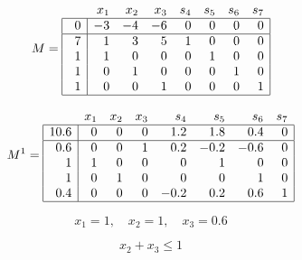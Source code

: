 {\newpage\clearpage
{}%
\begin{displaymath}
         M =
         \begin{array}{|r|rrrrrrr|}
            \multicolumn{1}{c}{\quad} & x_1 & x_2 & x_3 & s_4 & s_5 & s_6 &
                \multicolumn{1}{c}{s_7} \\\hline
             0 & -3 & -4 & -6 & 0 & 0 & 0 & 0 \\\hline
             7 & 1 & 3 & 5 & 1 & 0 & 0 & 0 \\
             1 & 1 & 0 & 0 & 0 & 1 & 0 & 0 \\
             1 & 0 & 1 & 0 & 0 & 0 & 1 & 0 \\
             1 & 0 & 0 & 1 & 0 & 0 & 0 & 1 \\\hline
         \end{array}
       \end{displaymath}%
\lthtmldisplayZ
\hfill\lthtmlcheckvsize\clearpage}

{\newpage\clearpage
{}%
\begin{displaymath}
         M^1 =
         \begin{array}{|r|rrrrrrr|}
            \multicolumn{1}{c}{\quad} & x_1 & x_2 & x_3 & s_4 & s_5 & s_6 &
                \multicolumn{1}{c}{s_7} \\\hline
             10.6 & 0 & 0 & 0 & 1.2 & 1.8 & 0.4 & 0 \\\hline
             0.6 & 0 & 0 & 1 & 0.2 & -0.2 & -0.6 & 0 \\
             1 & 1 & 0 & 0 & 0 & 1 & 0 & 0 \\
             1 & 0 & 1 & 0 & 0 & 0 & 1 & 0 \\
             0.4 & 0 & 0 & 0 & -0.2 & 0.2 & 0.6 & 1 \\\hline
         \end{array}
       \end{displaymath}%
\lthtmldisplayZ
\hfill\lthtmlcheckvsize\clearpage}

{\newpage\clearpage
{}%
\begin{displaymath}
  x_1=1, \quad x_2=1, \quad x_3=0.6
\end{displaymath}%
\lthtmldisplayZ
\hfill\lthtmlcheckvsize\clearpage}

{\newpage\clearpage
{}%
\begin{displaymath}
  x_2 + x_3 \leq 1
\end{displaymath}%
\lthtmldisplayZ
\hfill\lthtmlcheckvsize\clearpage}

